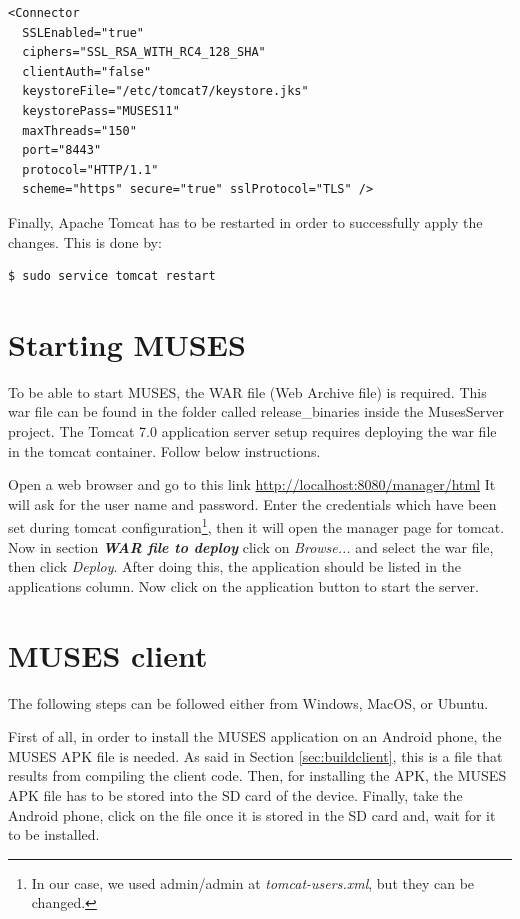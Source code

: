 \begin{verbatim}
<Connector
  SSLEnabled="true"
  ciphers="SSL_RSA_WITH_RC4_128_SHA"
  clientAuth="false"
  keystoreFile="/etc/tomcat7/keystore.jks"
  keystorePass="MUSES11"
  maxThreads="150"
  port="8443"
  protocol="HTTP/1.1"
  scheme="https" secure="true" sslProtocol="TLS" />
\end{verbatim}

Finally, Apache Tomcat has to be restarted in order to successfully apply the changes. This is done by:

\begin{verbatim}
$ sudo service tomcat restart
\end{verbatim}

\section{Starting MUSES}
\label{sec:musestart}

To be able to start MUSES, the WAR file (Web Archive file) is required. This war file can be found in the folder called release\_binaries inside the MusesServer project.
The Tomcat 7.0 application server setup requires deploying the war file in the tomcat container. Follow below instructions. 

Open a web browser and go to this link
\url{http://localhost:8080/manager/html} 
It will ask for the user name and password. Enter the credentials which have been set during tomcat configuration\footnote{In our case, we used admin/admin at \textit{tomcat-users.xml}, but they can be changed.}, then it will open the manager page for tomcat. Now in section \textit{\textbf{WAR file to deploy}} click on \textit{Browse...} and select the war file, then click \textit{Deploy}. 
After doing this, the application should be listed in the applications column. Now click on the application button to start the server.

\section{MUSES client}
\label{sec:musesclient}

The following steps can be followed either from Windows, MacOS, or Ubuntu.

First of all, in order to install the MUSES application on an Android phone, the MUSES APK file is needed. As said in Section \ref{sec:buildclient}, this is a file that results from compiling the client code. Then, for installing the APK, the MUSES APK file has to be stored into the SD card of the device. Finally, take the Android phone, click on the file once it is stored in the SD card and, wait for it to be installed.

